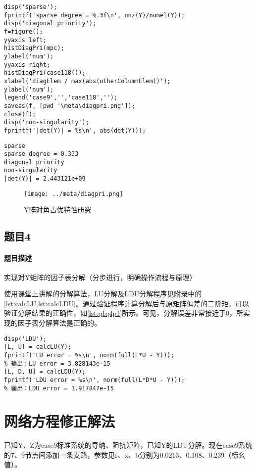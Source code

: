 \documentclass[a4paper,12pt]{article}
\begin{document}
    \begin{lstlisting}[style=Matlab-editor,basicstyle=\mlttfamily,label=lst:q1q3p1,caption={矩阵特性验证程序}]
%% feature of Y
disp('sparse');
fprintf('sparse degree = %.3f\n', nnz(Y)/numel(Y));
disp('diagonal priority');
f=figure();
yyaxis left;
histDiagPri(mpc);
ylabel('num');
yyaxis right;
histDiagPri(case118());
xlabel('diagElem / max(abs(otherColumnElem))');
ylabel('num');
legend('case9','','case118','');
saveas(f, [pwd '\meta\diagpri.png']);
close(f);
disp('non-singularity');
fprintf('|det(Y)| = %s\n', abs(det(Y)));
    \end{lstlisting}
    \begin{lstlisting}[label=lst:q1q3p2,caption={矩阵特性验证结果}]
sparse
sparse degree = 0.333
diagonal priority
non-singularity
|det(Y)| = 2.443121e+09
    \end{lstlisting}
    \begin{figure}
      \texttt{[image: ../meta/diagpri.png]}
      \caption{Y阵对角占优特性研究}
      \label{fig:diagpri}
    \end{figure}
    \subsection{题目4}
    \paragraph{题目描述} 实现对Y矩阵的因子表分解（分步进行，明确操作流程与原理）

    使用课堂上讲解的分解算法，LU分解及LDU分解程序见附录中的\cref{lst:calcLU,lst:calcLDU}。通过验证程序计算分解后与原矩阵偏差的二阶矩，可以验证分解结果的正确性，如\cref{lst:q1q4p1}所示。可见，分解误差非常接近于0，所实现的因子表分解算法是正确的。
    \begin{lstlisting}[style=Matlab-editor,basicstyle=\mlttfamily,label=lst:q1q4p1,caption={因子表分解及正确性验证}]
%% LDU
disp('LDU');
[L, U] = calcLU(Y);
fprintf('LU error = %s\n', norm(full(L*U - Y)));
% 输出：LU error = 3.828143e-15
[L, D, U] = calcLDU(Y);
fprintf('LDU error = %s\n', norm(full(L*D*U - Y)));
% 输出：LDU error = 1.917847e-15
    \end{lstlisting}
    \section{网络方程修正解法}
    已知Y、Z为case9标准系统的导纳、阻抗矩阵，已知Y的LDU分解。现在case9系统的7、9节点间添加一条支路，参数见r、x、b分别为0.0213、0.108、0.239（标幺值）。
\end{document}
